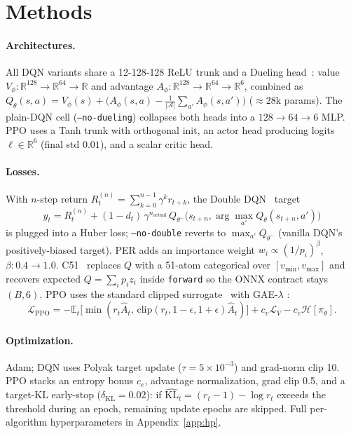 \section{Methods}
\label{sec:methods}

\paragraph{Architectures.} All DQN variants share a 12{-}128{-}128
ReLU trunk and a Dueling head~\citep{wang2016dueling}: value
$V_\phi:\mathbb{R}^{128}\!\to\!\mathbb{R}^{64}\!\to\!\mathbb{R}$ and
advantage
$A_\phi:\mathbb{R}^{128}\!\to\!\mathbb{R}^{64}\!\to\!\mathbb{R}^6$,
combined as $Q_\theta(s,a)=V_\phi(s)+\bigl(A_\phi(s,a)-\tfrac{1}{|\mathcal A|}\sum_{a'}A_\phi(s,a')\bigr)$
($\approx 28$k params). The plain-DQN cell (\texttt{--no-dueling})
collapses both heads into a $128{\to}64{\to}6$ MLP. PPO uses a Tanh
trunk with orthogonal init, an actor head producing logits
$\ell\in\mathbb{R}^6$ (final std $0.01$), and a scalar critic head.

\paragraph{Losses.} With $n$-step return
$R_t^{(n)}=\sum_{k=0}^{n-1}\gamma^k r_{t+k}$, the Double
DQN~\citep{vanhasselt2016double} target
\begin{equation}
y_t = R_t^{(n)} + (1-d_t)\,\gamma^{n_{\text{actual}}}\,
  Q_{\theta^-}\!\bigl(s_{t+n},\arg\max_{a'} Q_\theta(s_{t+n},a')\bigr)
\label{eq:double-target}
\end{equation}
is plugged into a Huber loss; \texttt{--no-double} reverts to
$\max_{a'}Q_{\theta^-}$ (vanilla DQN's positively-biased target). PER
\citep{schaul2016per} adds an importance weight
$w_i\propto(1/p_i)^\beta$, $\beta:0.4{\to}1.0$. C51~\citep{bellemare2017c51}
replaces $Q$ with a 51-atom categorical over $[v_{\min},v_{\max}]$ and
recovers expected $Q=\sum_i p_i z_i$ inside \texttt{forward} so the
ONNX contract stays $(B,6)$. PPO uses the standard clipped
surrogate~\citep{schulman2017ppo} with GAE-$\lambda$
\citep{schulman2016gae}:
\begin{equation}
\mathcal{L}_{\mathrm{PPO}} = -\mathbb{E}_t\!\bigl[\min(r_t\hat A_t,\,\mathrm{clip}(r_t,1{-}\epsilon,1{+}\epsilon)\hat A_t)\bigr] + c_v\mathcal{L}_V - c_e\mathcal{H}[\pi_\theta].
\label{eq:ppo}
\end{equation}

\paragraph{Optimization.} Adam; DQN uses Polyak target update
($\tau{=}5{\times}10^{-3}$) and grad-norm clip 10. PPO stacks an
entropy bonus $c_e$, advantage normalization, grad clip 0.5, and a
target-KL early-stop ($\delta_{\mathrm{KL}}{=}0.02$): if
$\widehat{\mathrm{KL}}_t=(r_t-1)-\log r_t$ exceeds the threshold during
an epoch, remaining update epochs are skipped. Full per-algorithm
hyperparameters in Appendix~\ref{app:hp}.

